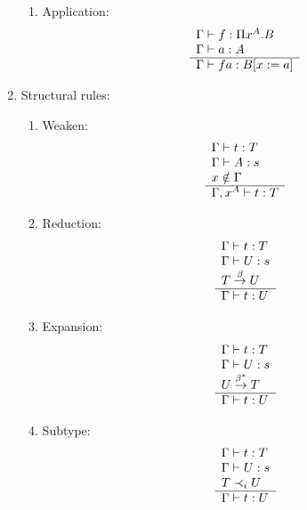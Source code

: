 \begin{definition}
\begin{enumerate}
\begin{enumerate}
        \item Application:
            $$
            \begin{array}{l} 
                \Gamma \vdash f: \Pi x^A. B
                \\
                \Gamma \vdash a: A
             \\ \hline 
                \Gamma \vdash f a: B[x:=a]
            \end{array}
            $$
    \end{enumerate}


    \item Structural rules:
        \begin{enumerate}
            \item Weaken:
                $$
                \begin{array}{l} 
                    \Gamma \vdash t: T
                    \\
                    \Gamma \vdash A: s
                    \\
                    x \notin \Gamma
                 \\ \hline 
                    \Gamma, x^A \vdash t: T
                \end{array}
                $$

            \item Reduction:
                $$
                \begin{array}{l} 
                    \Gamma \vdash t: T
                    \\
                    \Gamma \vdash U: s
                    \\
                    T \stackrel{\beta}{\to} U
                 \\ \hline 
                    \Gamma \vdash t: U
                \end{array}
                $$

            \item Expansion:
                $$
                \begin{array}{l} 
                    \Gamma \vdash t: T
                    \\
                    \Gamma \vdash U: s
                    \\
                    U \stackrel{\beta^*}{\to} T
                 \\ \hline 
                    \Gamma \vdash t: U
                \end{array}
                $$

            \item Subtype:
                $$
                \begin{array}{l} 
                    \Gamma \vdash t: T
                    \\
                    \Gamma \vdash U: s
                    \\
                    T \prec_i U
                 \\ \hline 
                    \Gamma \vdash t: U
                \end{array}
                $$
        \end{enumerate}
    \end{enumerate}
\end{definition}



